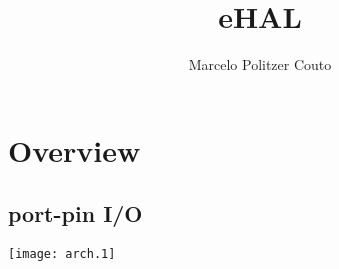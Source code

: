 \documentclass{article}
\title{eHAL}
\author{Marcelo Politzer Couto}
\begin{document}
\maketitle

\section{Overview}

\subsection{port-pin I/O}
\texttt{[image: arch.1]}
\end{document}
